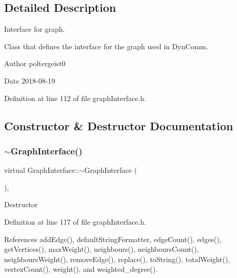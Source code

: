 \subsection{Detailed Description}
Interface for graph. 

Class that defines the interface for the graph used in Dyn\+Comm.

\begin{DoxyAuthor}{Author}
poltergeist0
\end{DoxyAuthor}
\begin{DoxyDate}{Date}
2018-\/08-\/19 
\end{DoxyDate}


Definition at line 112 of file graph\+Interface.\+h.



\subsection{Constructor \& Destructor Documentation}
\mbox{\label{classGraphInterface_a5f708904a9469c548d85a6788a245340}} 
\subsubsection{\texorpdfstring{$\sim$\+Graph\+Interface()}{~GraphInterface()}}
{\footnotesize\ttfamily virtual Graph\+Interface\+::$\sim$\+Graph\+Interface (\begin{DoxyParamCaption}{ }\end{DoxyParamCaption})\hspace{0.3cm}{\ttfamily [inline]}, {\ttfamily [virtual]}}

Destructor 

Definition at line 117 of file graph\+Interface.\+h.



References add\+Edge(), default\+String\+Formatter, edge\+Count(), edges(), get\+Vertices(), max\+Weight(), neighbours(), neighbours\+Count(), neighbours\+Weight(), remove\+Edge(), replace(), to\+String(), total\+Weight(), vertex\+Count(), weight(), and weighted\+\_\+degree().

